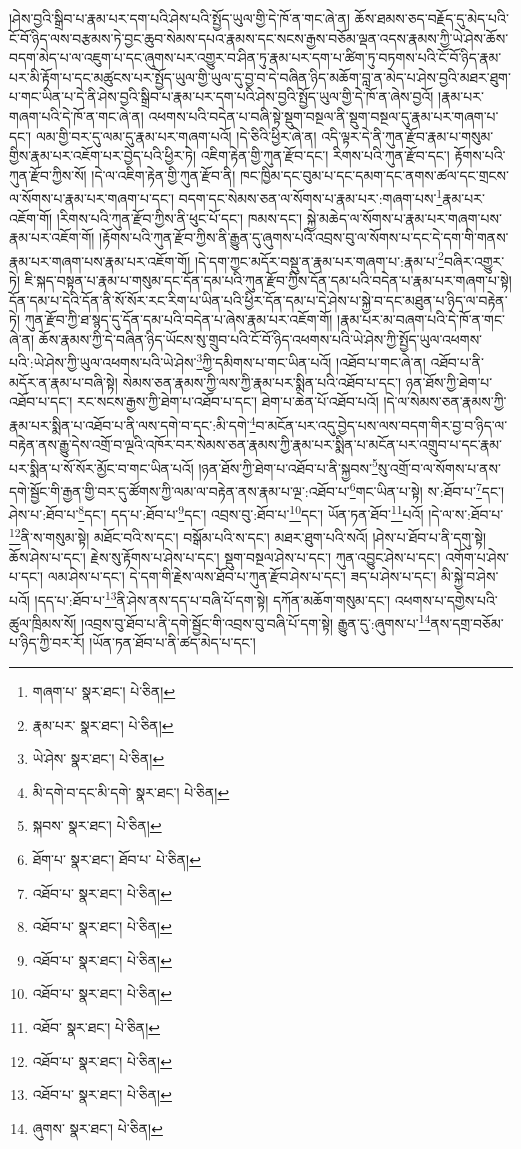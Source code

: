 །ཤེས་བྱའི་སྒྲིབ་པ་རྣམ་པར་དག་པའི་ཤེས་པའི་སྤྱོད་ཡུལ་གྱི་དེ་ཁོ་ན་གང་ཞེ་ན། ཆོས་ཐམས་ཅད་བརྗོད་དུ་མེད་པའི་ངོ་བོ་ཉིད་ལས་བརྩམས་ཏེ་བྱང་ཆུབ་སེམས་དཔའ་རྣམས་དང་སངས་རྒྱས་བཅོམ་ལྡན་འདས་རྣམས་ཀྱི་ཡེ་ཤེས་ཆོས་བདག་མེད་པ་ལ་འཇུག་པ་དང་ཞུགས་པར་འགྱུར་བ་ཤིན་ཏུ་རྣམ་པར་དག་པ་ཚིག་ཏུ་བཏགས་པའི་ངོ་བོ་ཉིད་རྣམ་པར་མི་རྟོག་པ་དང་མཚུངས་པར་སྤྱོད་ཡུལ་གྱི་ཡུལ་དུ་བྱ་བ་དེ་བཞིན་ཉིད་མཆོག་བླ་ན་མེད་པ་ཤེས་བྱའི་མཐར་ཐུག་པ་གང་ཡིན་པ་དེ་ནི་ཤེས་བྱའི་སྒྲིབ་པ་རྣམ་པར་དག་པའི་ཤེས་བྱའི་སྤྱོད་ཡུལ་གྱི་དེ་ཁོ་ན་ཞེས་བྱའོ། །རྣམ་པར་གཞག་པའི་དེ་ཁོ་ན་གང་ཞེ་ན། འཕགས་པའི་བདེན་པ་བཞི་སྟེ་སྡུག་བསྔལ་ནི་སྡུག་བསྔལ་དུ་རྣམ་པར་གཞག་པ་དང་། ལམ་གྱི་བར་དུ་ལམ་དུ་རྣམ་པར་གཞག་པའོ། །དེ་ཅིའི་ཕྱིར་ཞེ་ན། འདི་ལྟར་དེ་ནི་ཀུན་རྫོབ་རྣམ་པ་གསུམ་གྱིས་རྣམ་པར་འཇོག་པར་བྱེད་པའི་ཕྱིར་ཏེ། འཇིག་རྟེན་གྱི་ཀུན་རྫོབ་དང་། རིགས་པའི་ཀུན་རྫོབ་དང་། རྟོགས་པའི་ཀུན་རྫོབ་ཀྱིས་སོ། །དེ་ལ་འཇིག་རྟེན་གྱི་ཀུན་རྫོབ་ནི། ཁང་ཁྱིམ་དང་བུམ་པ་དང་དམག་དང་ནགས་ཚལ་དང་གྲངས་ལ་སོགས་པ་རྣམ་པར་གཞག་པ་དང་། བདག་དང་སེམས་ཅན་ལ་སོགས་པ་རྣམ་པར་:གཞག་པས་\footnote{གཞག་པ་  སྣར་ཐང་།  པེ་ཅིན། }རྣམ་པར་འཇོག་གོ། །རིགས་པའི་ཀུན་རྫོབ་ཀྱིས་ནི་ཕུང་པོ་དང་། ཁམས་དང་། སྐྱེ་མཆེད་ལ་སོགས་པ་རྣམ་པར་གཞག་པས་རྣམ་པར་འཇོག་གོ། །རྟོགས་པའི་ཀུན་རྫོབ་ཀྱིས་ནི་རྒྱུན་དུ་ཞུགས་པའི་འབྲས་བུ་ལ་སོགས་པ་དང་དེ་དག་གི་གནས་རྣམ་པར་གཞག་པས་རྣམ་པར་འཇོག་གོ། །དེ་དག་ཀྱང་མདོར་བསྡུ་ན་རྣམ་པར་གཞག་པ་:རྣམ་པ་\footnote{རྣམ་པར་  སྣར་ཐང་།  པེ་ཅིན། }བཞིར་འགྱུར་ཏེ། ཇི་སྐད་བསྟན་པ་རྣམ་པ་གསུམ་དང་དོན་དམ་པའི་ཀུན་རྫོབ་ཀྱིས་དོན་དམ་པའི་བདེན་པ་རྣམ་པར་གཞག་པ་སྟེ། དོན་དམ་པ་དེའི་དོན་ནི་སོ་སོར་རང་རིག་པ་ཡིན་པའི་ཕྱིར་དོན་དམ་པ་དེ་ཤེས་པ་སྐྱེ་བ་དང་མཐུན་པ་ཉིད་ལ་བརྟེན་ཏེ། ཀུན་རྫོབ་ཀྱི་ཐ་སྙད་དུ་དོན་དམ་པའི་བདེན་པ་ཞེས་རྣམ་པར་འཇོག་གོ། །རྣམ་པར་མ་བཞག་པའི་དེ་ཁོ་ན་གང་ཞེ་ན། ཆོས་རྣམས་ཀྱི་དེ་བཞིན་ཉིད་ཡོངས་སུ་གྲུབ་པའི་ངོ་བོ་ཉིད་འཕགས་པའི་ཡེ་ཤེས་ཀྱི་སྤྱོད་ཡུལ་འཕགས་པའི་:ཡེ་ཤེས་ཀྱི་ཡུལ་འཕགས་པའི་ཡེ་ཤེས་\footnote{ཡེ་ཤེས་  སྣར་ཐང་།  པེ་ཅིན། }ཀྱི་དམིགས་པ་གང་ཡིན་པའོ། །འཐོབ་པ་གང་ཞེ་ན། འཐོབ་པ་ནི་མདོར་ན་རྣམ་པ་བཞི་སྟེ། སེམས་ཅན་རྣམས་ཀྱི་ལས་ཀྱི་རྣམ་པར་སྨིན་པའི་འཐོབ་པ་དང་། ཉན་ཐོས་ཀྱི་ཐེག་པ་འཐོབ་པ་དང་། རང་སངས་རྒྱས་ཀྱི་ཐེག་པ་འཐོབ་པ་དང་། ཐེག་པ་ཆེན་པོ་འཐོབ་པའོ། །དེ་ལ་སེམས་ཅན་རྣམས་ཀྱི་རྣམ་པར་སྨིན་པ་འཐོབ་པ་ནི་ལས་དགེ་བ་དང་:མི་དགེ་\footnote{མི་དགེ་བ་དང་མི་དགེ་  སྣར་ཐང་།  པེ་ཅིན། }བ་མངོན་པར་འདུ་བྱེད་པས་ལས་བདག་གིར་བྱ་བ་ཉིད་ལ་བརྟེན་ནས་རྒྱུ་དེས་འགྲོ་བ་ལྔའི་འཁོར་བར་སེམས་ཅན་རྣམས་ཀྱི་རྣམ་པར་སྨིན་པ་མངོན་པར་འགྲུབ་པ་དང་རྣམ་པར་སྨིན་པ་སོ་སོར་མྱོང་བ་གང་ཡིན་པའོ། །ཉན་ཐོས་ཀྱི་ཐེག་པ་འཐོབ་པ་ནི་སྐྱབས་\footnote{སྐབས་  སྣར་ཐང་།  པེ་ཅིན། }སུ་འགྲོ་བ་ལ་སོགས་པ་ནས་དགེ་སྦྱོང་གི་རྒྱན་གྱི་བར་དུ་ཚོགས་ཀྱི་ལམ་ལ་བརྟེན་ནས་རྣམ་པ་ལྔ་:འཐོབ་པ་\footnote{ཐོག་པ་  སྣར་ཐང་། ཐོབ་པ་  པེ་ཅིན། }གང་ཡིན་པ་སྟེ། ས་:ཐོབ་པ་\footnote{འཐོབ་པ་  སྣར་ཐང་།  པེ་ཅིན། }དང་། ཤེས་པ་:ཐོབ་པ་\footnote{འཐོབ་པ་  སྣར་ཐང་།  པེ་ཅིན། }དང་། དད་པ་:ཐོབ་པ་\footnote{འཐོབ་པ་  སྣར་ཐང་།  པེ་ཅིན། }དང་། འབྲས་བུ་:ཐོབ་པ་\footnote{འཐོབ་པ་  སྣར་ཐང་།  པེ་ཅིན། }དང་། ཡོན་ཏན་ཐོབ་\footnote{འཐོབ་  སྣར་ཐང་།  པེ་ཅིན། }པའོ། །དེ་ལ་ས་:ཐོབ་པ་\footnote{འཐོབ་པ་  སྣར་ཐང་།  པེ་ཅིན། }ནི་ས་གསུམ་སྟེ། མཐོང་བའི་ས་དང་། བསྒོམ་པའི་ས་དང་། མཐར་ཐུག་པའི་སའོ། །ཤེས་པ་ཐོབ་པ་ནི་དགུ་སྟེ། ཆོས་ཤེས་པ་དང་། རྗེས་སུ་རྟོགས་པ་ཤེས་པ་དང་། སྡུག་བསྔལ་ཤེས་པ་དང་། ཀུན་འབྱུང་ཤེས་པ་དང་། འགོག་པ་ཤེས་པ་དང་། ལམ་ཤེས་པ་དང་། དེ་དག་གི་རྗེས་ལས་ཐོབ་པ་ཀུན་རྫོབ་ཤེས་པ་དང་། ཟད་པ་ཤེས་པ་དང་། མི་སྐྱེ་བ་ཤེས་པའོ། །དད་པ་:ཐོབ་པ་\footnote{འཐོབ་པ་  སྣར་ཐང་།  པེ་ཅིན། }ནི་ཤེས་ནས་དད་པ་བཞི་པོ་དག་སྟེ། དཀོན་མཆོག་གསུམ་དང་། འཕགས་པ་དགྱེས་པའི་ཚུལ་ཁྲིམས་སོ། །འབྲས་བུ་ཐོབ་པ་ནི་དགེ་སྦྱོང་གི་འབྲས་བུ་བཞི་པོ་དག་སྟེ། རྒྱུན་དུ་:ཞུགས་པ་\footnote{ཞུགས་  སྣར་ཐང་།  པེ་ཅིན། }ནས་དགྲ་བཅོམ་པ་ཉིད་ཀྱི་བར་རོ། །ཡོན་ཏན་ཐོབ་པ་ནི་ཚད་མེད་པ་དང་། 